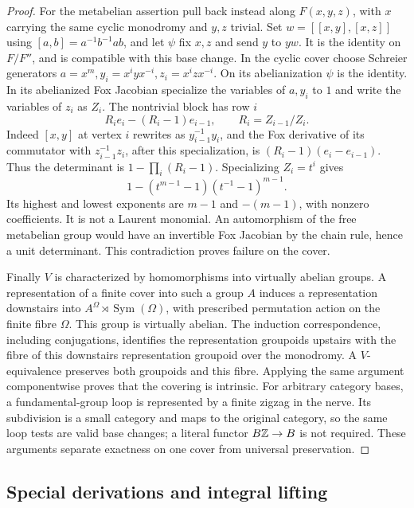 \begin{proof}
For the metabelian assertion pull back instead along $F(x,y,z)$,
with $x$ carrying the same cyclic monodromy and $y,z$ trivial.
Set $w=[[x,y],[x,z]]$ using $[a,b]=a^{-1}b^{-1}ab$, and let
$\psi$ fix $x,z$ and send $y$ to $yw$. It is the identity on
$F/F''$, and is compatible with this base change. In the
cyclic cover choose Schreier generators
$a=x^m,y_i=x^iyx^{-i},z_i=x^izx^{-i}$.
On its abelianization $\psi$ is the identity. In its abelianized
Fox Jacobian specialize the variables of $a,y_i$ to $1$ and
write the variables of $z_i$ as $Z_i$.
The nontrivial block has row $i$
\[
 R_i e_i-(R_i-1)e_{i-1},\qquad R_i=Z_{i-1}/Z_i.
\]
Indeed $[x,y]$ at vertex $i$ rewrites as
$y_{i-1}^{-1}y_i$, and the Fox derivative of its commutator
with $z_{i-1}^{-1}z_i$, after this specialization, is
$(R_i-1)(e_i-e_{i-1})$. Thus the determinant is
$1-\prod_i(R_i-1)$.
Specializing $Z_i=t^i$ gives
\[
 1-(t^{m-1}-1)(t^{-1}-1)^{m-1}.
\]
Its highest and lowest exponents are $m-1$ and $-(m-1)$,
with nonzero coefficients. It is not a Laurent monomial.
An automorphism of the free metabelian group would have an
invertible Fox Jacobian by the chain rule, hence a unit
determinant. This contradiction proves failure on the cover.

Finally $V$ is characterized by homomorphisms into virtually
abelian groups. A representation of a finite cover into such
a group $A$ induces a representation downstairs into
$A^\Omega\rtimes\operatorname{Sym}(\Omega)$, with prescribed
permutation action on the finite fibre $\Omega$. This group is
virtually abelian. The induction correspondence, including
conjugations, identifies the representation groupoids upstairs
with the fibre of this downstairs representation groupoid over
the monodromy. A $V$-equivalence preserves both groupoids and
this fibre. Applying the same argument componentwise proves
that the covering is intrinsic. For arbitrary category bases,
a fundamental-group loop is represented by a finite zigzag
in the nerve. Its subdivision is a small category and maps
to the original category, so the same loop tests are valid
base changes; a literal functor $B\mathbb Z\to B$ is not required.
These arguments separate
exactness on one cover from universal preservation.
\end{proof}

\subsection{Special derivations and integral lifting}

